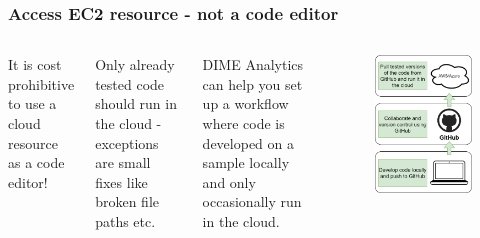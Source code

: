 \documentclass[aspectratio=169]{beamer} %
\begin{document}
\begin{frame}
	\frametitle{Access EC2 resource - not a code editor}

	\begin{columns}[c]

		It is cost prohibitive to use a cloud resource as a code editor!

		\vspace{.5cm}

		Only already tested code should run in the cloud
		- exceptions are small fixes like broken file paths etc.

		\vspace{.5cm}

		DIME Analytics can help you set up a workflow
		where code is developed on a sample locally
		and only occasionally run in the cloud.

		\begin{figure}
			\centering
			\includegraphics[width=.8\textwidth]{./img/code-workflow.png}
		\end{figure}
	\end{columns}
\end{frame}
\end{document}
